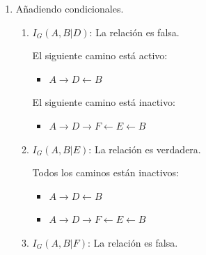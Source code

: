 \documentclass[12pt,a4paper]{article}
\begin{document}
\begin{enumerate}
\begin{enumerate}
        \begin{multicols}{2}
            El siguiente camino está activo:
            \begin{itemize}
                \item $D \leftarrow B \to E \to G$
            \end{itemize}

            El siguiente camino está inactivo:
            \begin{itemize}
                \item $D \to F \leftarrow E \to G$
            \end{itemize}
        \end{multicols}
        
    \end{enumerate}
    \item Añadiendo condicionales.
    \begin{enumerate}
        \item $I_G(A, B | D)$: \; La relación es falsa.
        
        \begin{multicols}{2}
            El siguiente camino está activo:
            \begin{itemize}
                \item $A \to D \leftarrow B$
            \end{itemize}

            El siguiente camino está inactivo:
            \begin{itemize}
                \item $A \to D \to F \leftarrow E \leftarrow B$
            \end{itemize}
        \end{multicols}

        \item $I_G(A, B | E)$: \; La relación es verdadera.
        
        Todos los caminos están inactivos:
        \begin{multicols}{2}
            \begin{itemize}
                \item $A \to D \leftarrow B$
                \item $A \to D \to F \leftarrow E \leftarrow B$
            \end{itemize}
        \end{multicols}

        \item $I_G(A, B | F)$: \; La relación es falsa.
        

\end{enumerate}
\end{enumerate}
\end{document}

